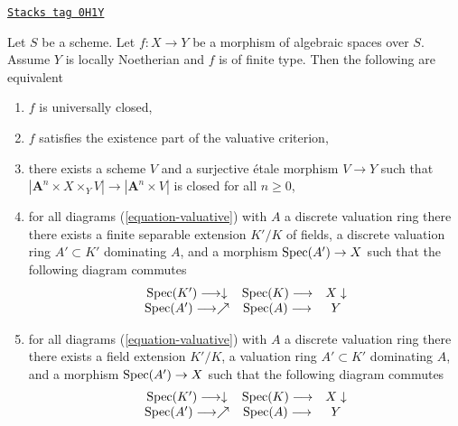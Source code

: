 \begin{lemma}
\label{spaces-limits-lemma-check-universally-closed-Noetherian}
\href{https://stacks.math.columbia.edu/tag/0H1Y}{\texttt{Stacks tag 0H1Y}}

Let $S$ be a scheme. Let $f : X \to Y$ be a morphism of algebraic
spaces over $S$. Assume $Y$ is locally Noetherian and $f$ is
of finite type. Then the following are equivalent
\begin{enumerate}
\item $f$ is universally closed,
\item $f$ satisfies the existence part of the valuative criterion,
\item there exists a scheme $V$ and a surjective \'etale morphism
$V \to Y$ such that
$|\mathbf{A}^n \times X \times_Y V| \to |\mathbf{A}^n \times V|$ is closed
for all $n \geq 0$,
\item for all diagrams (\ref{equation-valuative}) with $A$ a discrete
valuation ring there there exists a finite separable extension $K'/K$
of fields, a discrete valuation ring $A' \subset K'$ dominating $A$, and
a morphism $\operatorname{Spec}(A') \to X$ such that the following diagram commutes
$$
\begin{array}{ccc}\operatorname{Spec}(K') \longrightarrow\downarrow & \operatorname{Spec}(K) \longrightarrow & X \downarrow \\ \operatorname{Spec}(A') \longrightarrow\nearrow & \operatorname{Spec}(A) \longrightarrow & Y\end{array}
$$
\item for all diagrams (\ref{equation-valuative}) with $A$ a discrete
valuation ring there there exists a field extension $K'/K$,
a valuation ring $A' \subset K'$ dominating $A$, and
a morphism $\operatorname{Spec}(A') \to X$ such that the following diagram commutes
$$
\begin{array}{ccc}\operatorname{Spec}(K') \longrightarrow\downarrow & \operatorname{Spec}(K) \longrightarrow & X \downarrow \\ \operatorname{Spec}(A') \longrightarrow\nearrow & \operatorname{Spec}(A) \longrightarrow & Y\end{array}
$$
\end{enumerate}
\end{lemma}

